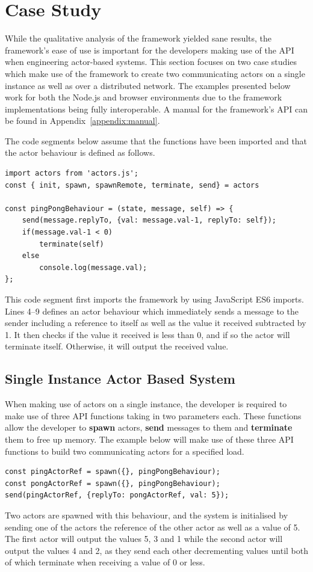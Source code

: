 \documentclass[oneside]{um-fict}
\begin{document}
\section{Case Study}
While the qualitative analysis of the framework yielded sane results, the framework's ease of use is important for the developers making use of the API when engineering actor-based systems. This section focuses on two case studies which make use of the framework to create two communicating actors on a single instance as well as over a distributed network. The examples presented below work for both the Node.js and browser environments due to the framework implementations being fully interoperable. A manual for the framework's API can be found in Appendix~\ref{appendix:manual}.

The code segments below assume that the functions have been imported and that the actor behaviour is defined as follows.
\begin{lstlisting}    
import actors from 'actors.js';
const { init, spawn, spawnRemote, terminate, send} = actors

const pingPongBehaviour = (state, message, self) => {
    send(message.replyTo, {val: message.val-1, replyTo: self});
    if(message.val-1 < 0)
        terminate(self)
    else    
        console.log(message.val);
};
\end{lstlisting}
This code segment first imports the framework by using JavaScript ES6 imports. Lines 4--9 defines an actor behaviour which immediately sends a message to the sender including a reference to itself as well as the value it received subtracted by 1. It then checks if the value it received is less than 0, and if so the actor will terminate itself. Otherwise, it will output the received value. 
\subsection{Single Instance Actor Based System}
When making use of actors on a single instance, the developer is required to make use of three API functions taking in two parameters each. These functions allow the developer to \textbf{spawn} actors, \textbf{send} messages to them and \textbf{terminate} them to free up memory. The example below will make use of these three API functions to build two communicating actors for a specified load.
\begin{lstlisting}    
const pingActorRef = spawn({}, pingPongBehaviour);
const pongActorRef = spawn({}, pingPongBehaviour);
send(pingActorRef, {replyTo: pongActorRef, val: 5});
\end{lstlisting}
Two actors are spawned with this behaviour, and the system is initialised by sending one of the actors the reference of the other actor as well as a value of 5. The first actor will output the values 5, 3 and 1 while the second actor will output the values 4 and 2, as they send each other decrementing values until both of which terminate when receiving a value of 0 or less.
\end{document}
